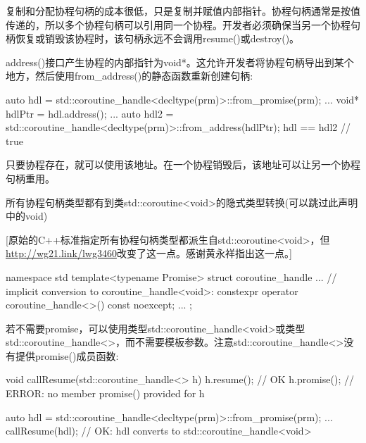 复制和分配协程句柄的成本很低，只是复制并赋值内部指针。协程句柄通常是按值传递的，所以多个协程句柄可以引用同一个协程。开发者必须确保当另一个协程句柄恢复或销毁该协程时，该句柄永远不会调用resume()或destroy()。

address()接口产生协程的内部指针为void*。这允许开发者将协程句柄导出到某个地方，然后使用from\_address()的静态函数重新创建句柄:

\begin{cpp}
auto hdl = std::coroutine_handle<decltype(prm)>::from_promise(prm);
...
void* hdlPtr = hdl.address();
...
auto hdl2 = std::coroutine_handle<decltype(prm)>::from_address(hdlPtr);
hdl == hdl2 // true
\end{cpp}

只要协程存在，就可以使用该地址。在一个协程销毁后，该地址可以让另一个协程句柄重用。


所有协程句柄类型都有到类std::coroutine<void>的隐式类型转换(可以跳过此声明中的void)

[原始的C++标准指定所有协程句柄类型都派生自std::coroutine<void>，但\url{http://wg21.link/lwg3460}改变了这一点。感谢黄永祥指出这一点。]

\begin{cpp}
namespace std {
	template<typename Promise>
	struct coroutine_handle {
		...
		// implicit conversion to coroutine_handle<void>:
		constexpr operator coroutine_handle<>() const noexcept;
		...
	};
}
\end{cpp}

若不需要promise，可以使用类型std::coroutine\_handle<void>或类型std::coroutine\_handle<>，而不需要模板参数。注意std::coroutine\_handle<>没有提供promise()成员函数:

\begin{cpp}
void callResume(std::coroutine_handle<> h)
{
	h.resume(); // OK
	h.promise(); // ERROR: no member promise() provided for h
}

auto hdl = std::coroutine_handle<decltype(prm)>::from_promise(prm);
...
callResume(hdl); // OK: hdl converts to std::coroutine_handle<void>
\end{cpp}








